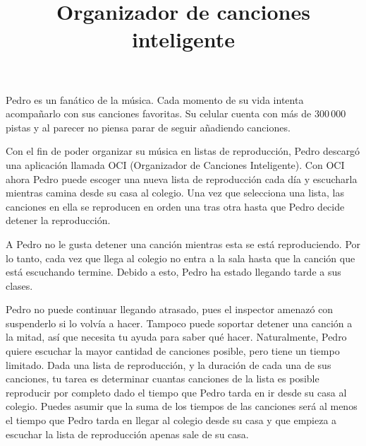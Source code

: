 \documentclass{oci}
\title{Organizador de canciones inteligente}
\begin{document}
\begin{problemDescription}
Pedro es un fanático de la música.
Cada momento de su vida intenta acompañarlo con sus canciones favoritas.
Su celular cuenta con más de 300\,000 pistas y al parecer no piensa parar de
seguir añadiendo canciones.

Con el fin de poder organizar su música en listas de reproducción, Pedro
descargó una aplicación llamada OCI (Organizador de Canciones Inteligente).
Con OCI ahora Pedro puede escoger una nueva lista de reproducción cada día y
escucharla mientras camina desde su casa al colegio.
Una vez que selecciona una lista, las canciones en ella se reproducen en orden
una tras otra hasta que Pedro decide detener la reproducción.

A Pedro no le gusta detener una canción mientras esta se está reproduciendo.
Por lo tanto, cada vez que llega al colegio no entra a la sala hasta que la
canción que está escuchando termine.
Debido a esto, Pedro ha estado llegando tarde a sus clases.

Pedro no puede continuar llegando atrasado, pues el inspector amenazó
con suspenderlo si lo volvía a hacer.
Tampoco puede soportar detener una canción a la mitad, así que necesita tu ayuda
para saber qué hacer.
Naturalmente, Pedro quiere escuchar la mayor cantidad de canciones posible,
pero tiene un tiempo limitado.
Dada una lista de reproducción, y la duración de cada una de sus canciones, tu
tarea es determinar cuantas canciones de la lista es posible reproducir por
completo dado el tiempo que Pedro tarda en ir desde su casa al colegio.
Puedes asumir que la suma de los tiempos de las canciones será al menos el tiempo
que Pedro tarda en llegar al colegio desde su casa y que empieza a escuchar la
lista de reproducción apenas sale de su casa.

\end{problemDescription}
\end{document}
